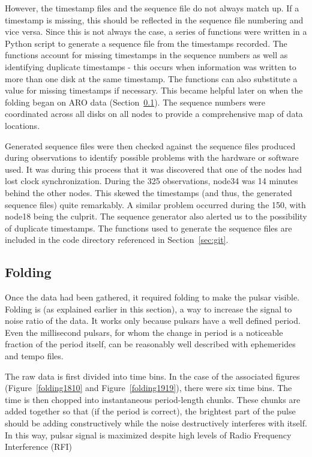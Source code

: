 \documentclass[a4paper,12pt]{article}
\begin{document}
However, the timestamp files and the sequence file do not always match up. If a timestamp is missing, this should be reflected in the sequence file numbering and vice versa. Since this is not always the case, a series of functions were written in a Python script to generate a sequence file from the timestamps recorded. The functions account for missing timestamps in the sequence numbers as well as identifying duplicate timestamps - this occurs when information was written to more than one disk at the same timestamp. The functions can also substitute a value for missing timestamps if necessary. This became helpful later on when the folding began on ARO data (Section~\ref{sec:folding}). The sequence numbers were coordinated across all disks on all nodes to provide a comprehensive map of data locations.

Generated sequence files were then checked against the sequence files produced during observations to identify possible problems with the hardware or software used. It was during this process that it was discovered that one of the nodes had lost clock synchronization. During the \unit{325}{\mega\hertz} observations, node34 was 14 minutes behind the other nodes. This skewed the timestamps (and thus, the generated sequence files) quite remarkably. A similar problem occurred during the \unit{150}{\mega\hertz}, with node18 being the culprit. The sequence generator also alerted us to the possibility of duplicate timestamps. The functions used to generate the sequence files are included in the code directory referenced in Section~\ref{sec:git}.

\subsection{Folding}
\label{sec:folding}

Once the data had been gathered, it required folding to make the pulsar visible. Folding is (as explained earlier in this section), a way to increase the signal to noise ratio of the data. It works only because pulsars have a well defined period. Even the millisecond pulsars, for whom the change in period is a noticeable fraction of the period itself, can be reasonably well described with ephemerides and tempo files.

The raw data is first divided into time bins. In the case of the associated figures (Figure~\ref{folding1810} and Figure~\ref{folding1919}), there were six time bins. The time is then chopped into instantaneous period-length chunks. These chunks are added together so that (if the period is correct), the brightest part of the pulse should be adding constructively while the noise destructively interferes with itself. In this way, pulsar signal is maximized despite high levels of Radio Frequency Interference (RFI)
\end{document}
